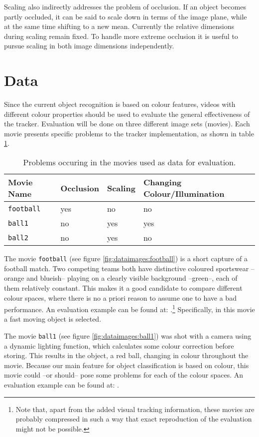 \documentclass[a4paper,11pt]{article}
\begin{document}
Scaling also indirectly addresses the problem of occlusion.
If an object becomes partly occluded, it can be said to scale down in terms of the image plane, while at the same time shifting to a new mean.
Currently the relative dimensions during scaling remain fixed.
To handle more extreme occlusion it is useful to pursue scaling in both image dimensions independently.


\section{Data}
\label{sec:data}
Since the current object recognition is based on colour features, videos with different colour properties should be used to evaluate the general effectiveness of the tracker.
Evaluation will be done on three different image sets (movies).
Each movie presents specific problems to the tracker implementation, as shown in table \ref{tab:dataproblems}.

\begin{table}[ht]
  \centering
  \begin{tabular}{|l||l|l|l|}
    \hline
    Movie Name        & Occlusion & Scaling & Changing Colour/Illumination\\
    \hline
    \texttt{football} & yes       & no      & no\\
    \texttt{ball1}    & no        & yes     & yes\\
    \texttt{ball2}    & no        & yes     & no\\
    \hline
  \end{tabular}
  \caption{Problems occuring in the movies used as data for evaluation.}
  \label{tab:dataproblems}
\end{table}

The movie \texttt{football} (see figure \ref{fig:dataimages:football}) is a short capture of a football match.
Two competing teams both have distinctive coloured sportswear --orange and blueish-- playing on a clearly visible background --green--, each of them relatively constant.
This makes it a good candidate to compare different colour spaces, where there is no a priori reason to assume one to have a bad performance. An evaluation example can be found at: .\footnote{Note that, apart from the added visual tracking information, these movies are probably compressed in such a way that exact reproduction of the evaluation might not be possible.}
Specifically, in this movie a fast moving object is selected.

The movie \texttt{ball1} (see figure \ref{fig:dataimages:ball1}) was shot with a camera using a dynamic lighting function, which calculates some colour correction before storing.
This results in the object, a red ball, changing in colour throughout the movie.
Because our main feature for object classification is based on colour, this movie could --or should-- pose some problems for each of the colour spaces. An evaluation example can be found at: .
\end{document}
